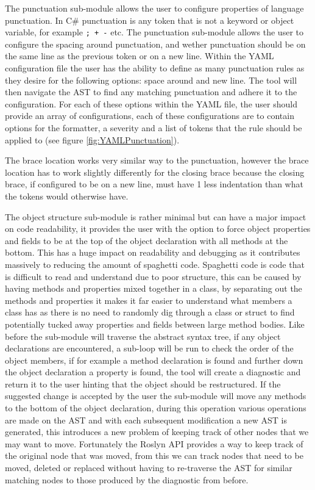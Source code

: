 The punctuation sub-module allows the user to configure properties of language punctuation. In C\# punctuation is any token that is not a keyword or object variable, for example \texttt{; + -} etc. The punctuation sub-module allows the user to configure the spacing around punctuation, and wether punctuation should be on the same line as the previous token or on a new line. Within the YAML configuration file the user has the ability to define as many punctuation rules as they desire for the following options: space around and new line. The tool will then navigate the AST to find any matching punctuation and adhere it to the configuration. For each of these options within the YAML file, the user should provide an array of configurations, each of these configurations are to contain options for the formatter, a severity and a list of tokens that the rule should be applied to (see figure \ref{fig:YAMLPunctuation}).

The brace location works very similar way to the punctuation, however the brace location has to work slightly differently for the closing brace because the closing brace, if configured to be on a new line, must have 1 less indentation than what the tokens would otherwise have.

The object structure sub-module is rather minimal but can have a major impact on code readability, it provides the user with the option to force object properties and fields to be at the top of the object declaration with all methods at the bottom. This has a huge impact on readability and debugging as it contributes massively to reducing the amount of spaghetti code. Spaghetti code is code that is difficult to read and understand due to poor structure, this can be caused by having methods and properties mixed together in a class, by separating out the methods and properties it makes it far easier to understand what members a class has as there is no need to randomly dig through a class or struct to find potentially tucked away properties and fields between large method bodies.
Like before the sub-module will traverse the abstract syntax tree, if any object declarations are encountered, a sub-loop will be run to check the order of the object members, if for example a method declaration is found and further down the object declaration a property is found, the tool will create a diagnostic and return it to the user hinting that the object should be restructured. If the suggested change is accepted by the user the sub-module will move any methods to the bottom of the object declaration, during this operation various operations are made on the AST and with each subsequent modification a new AST is generated, this introduces a new problem of keeping track of other nodes that we may want to move. Fortunately the Roslyn API provides a way to keep track of the original node that was moved, from this we can track nodes that need to be moved, deleted or replaced without having to re-traverse the AST for similar matching nodes to those produced by the diagnostic from before.
